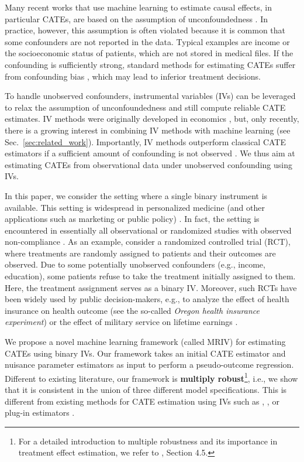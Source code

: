 \documentclass{article} %
\newcommand{\frameworkname}{MRIV\xspace}
\theoremstyle{definition}
\theoremstyle{plain}
\begin{document}

Many recent works that use machine learning to estimate causal effects, in particular CATEs, are based on the assumption of unconfoundedness \citep{Alaa.2017, Lim.2018, Melnychuk.2022, Melnychuk.2022b}. In practice, however, this assumption is often violated because it is common that some confounders are not reported in the data. Typical examples are income or the socioeconomic status of patients, which are not stored in medical files. If the confounding is sufficiently strong, standard methods for estimating CATEs suffer from confounding bias \citep{Pearl.2009}, which may lead to inferior treatment decisions. 

To handle unobserved confounders, instrumental variables (IVs) can be leveraged to relax the assumption of unconfoundedness and still compute reliable CATE estimates. IV methods were originally developed in economics \citep{Wright.1928}, but, only recently, there is a growing interest in combining IV methods with machine learning (see Sec.~\ref{sec:related_work}). Importantly, IV methods outperform classical CATE estimators if a sufficient amount of confounding is not observed \citep{Hartford.2017}. We thus aim at estimating CATEs from observational data under unobserved confounding using IVs.


In this paper, we consider the setting where a single binary instrument is available. This setting is widespread in personalized medicine (and other applications such as marketing or public policy) \citep{Bloom.1997}. In fact, the setting is encountered in essentially all observational or randomized studies with observed non-compliance \citep{Imbens.1994}. As an example, consider a randomized controlled trial (RCT), where treatments are randomly assigned to patients and their outcomes are observed. Due to some potentially unobserved confounders (e.g., income, education), some patients refuse to take the treatment initially assigned to them. Here, the treatment assignment serves as a binary IV. Moreover, such RCTs have been widely used by public decision-makers, e.g., to analyze the effect of health insurance on health outcome (see the so-called \emph{Oregon health insurance experiment}) \citep{Finkelstein.2012} or the effect of military service on lifetime earnings \citep{Angrist.1990}.


We propose a novel machine learning framework (called \frameworkname) for estimating CATEs using binary IVs. Our framework takes an initial CATE estimator and nuisance parameter estimators as input to perform a pseudo-outcome regression. Different to existing literature, our framework is \textbf{multiply robust}\footnote{For a detailed introduction to multiple robustness and its importance in treatment effect estimation, we refer to \citep{Wang.2018}, Section 4.5.}, i.e., we show that it is consistent in the union of three different model specifications. This is different from existing methods for CATE estimation using IVs such as \citet{Okui.2012}, \citet{Syrgkanis.2019}, or plug-in estimators \citep{BargagliStoffi.2021, Imbens.1994}.
\end{document}
